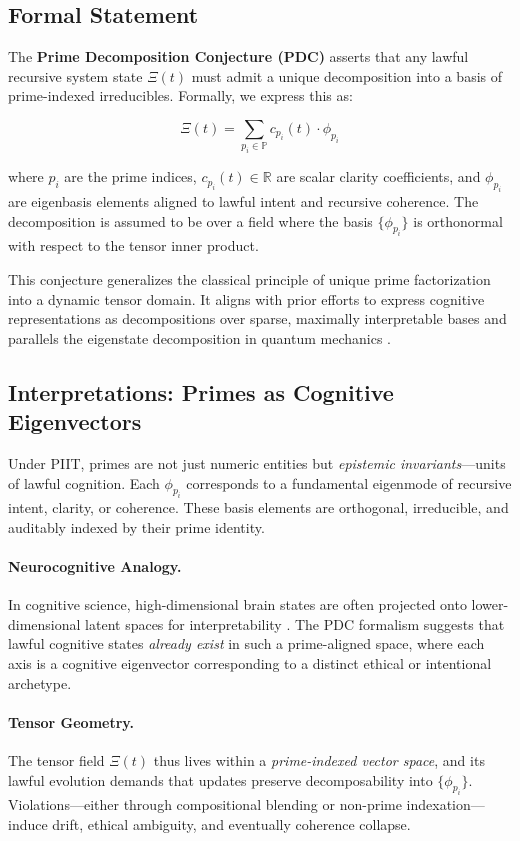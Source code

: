 \documentclass[12pt]{article}
\begin{document}
\subsection{Formal Statement}

The \textbf{Prime Decomposition Conjecture (PDC)} asserts that any lawful recursive system state $\Xi(t)$ must admit a unique decomposition into a basis of prime-indexed irreducibles. Formally, we express this as:

\[
\Xi(t) = \sum_{p_i \in \mathbb{P}} c_{p_i}(t) \cdot \phi_{p_i}
\]

where $p_i$ are the prime indices, $c_{p_i}(t) \in \mathbb{R}$ are scalar clarity coefficients, and $\phi_{p_i}$ are eigenbasis elements aligned to lawful intent and recursive coherence. The decomposition is assumed to be over a field where the basis $\{ \phi_{p_i} \}$ is orthonormal with respect to the tensor inner product.

This conjecture generalizes the classical principle of unique prime factorization into a dynamic tensor domain. It aligns with prior efforts to express cognitive representations as decompositions over sparse, maximally interpretable bases \cite{olshausen1996emergence} and parallels the eigenstate decomposition in quantum mechanics \cite{ballentine1998quantum}.

\subsection{Interpretations: Primes as Cognitive Eigenvectors}

Under PIIT, primes are not just numeric entities but \textit{epistemic invariants}—units of lawful cognition. Each $\phi_{p_i}$ corresponds to a fundamental eigenmode of recursive intent, clarity, or coherence. These basis elements are orthogonal, irreducible, and auditably indexed by their prime identity.

\paragraph{Neurocognitive Analogy.}
In cognitive science, high-dimensional brain states are often projected onto lower-dimensional latent spaces for interpretability \cite{ghahramani2000unsupervised}. The PDC formalism suggests that lawful cognitive states \emph{already exist} in such a prime-aligned space, where each axis is a cognitive eigenvector corresponding to a distinct ethical or intentional archetype.

\paragraph{Tensor Geometry.}
The tensor field $\Xi(t)$ thus lives within a \emph{prime-indexed vector space}, and its lawful evolution demands that updates preserve decomposability into $\{ \phi_{p_i} \}$. Violations—either through compositional blending or non-prime indexation—induce drift, ethical ambiguity, and eventually coherence collapse.
\end{document}
